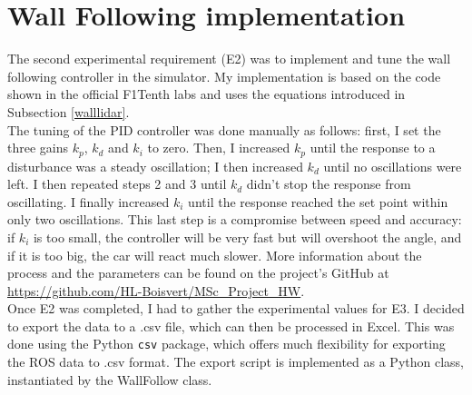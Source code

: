\section{Wall Following implementation}
The second experimental requirement (E2) was to implement and tune the wall following controller in the simulator. My implementation is based on the code shown in the official F1Tenth labs and uses the equations introduced in Subsection \ref{walllidar}. \\
The tuning of the PID controller was done manually as follows: first, I set the three gains $k_p$, $k_d$ and $k_i$ to zero. Then, I increased $k_p$ until the response to a disturbance was a steady oscillation; I then increased $k_d$ until no oscillations were left. I then repeated steps 2 and 3 until $k_d$ didn't stop the response from oscillating. I finally increased $k_i$ until the response reached the set point within only two oscillations. This last step is a compromise between speed and accuracy: if $k_i$ is too small, the controller will be very fast but will overshoot the angle, and if it is too big, the car will react much slower. More information about the process and the parameters can be found on the project's GitHub at \url{https://github.com/HL-Boisvert/MSc_Project_HW}. \\
Once E2 was completed, I had to gather the experimental values for E3. I decided to export the data to a .csv file, which can then be processed in Excel. This was done using the Python \verb|csv| package, which offers much flexibility for exporting the ROS data to .csv format. The export script is implemented as a Python class, instantiated by the WallFollow class. 

